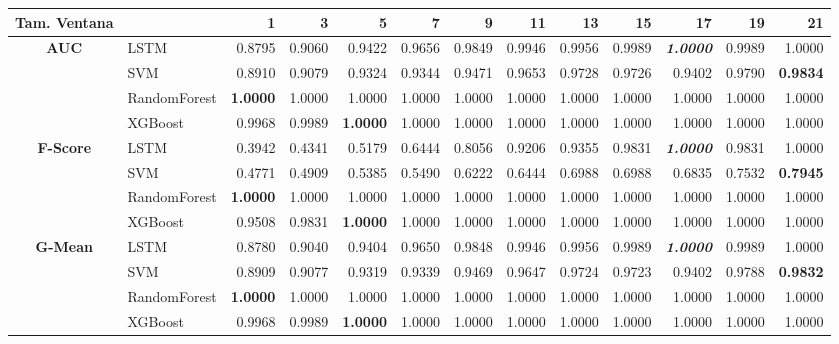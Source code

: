 \begin{table}[H]
\centering
\begin{adjustbox}{max width=14cm}
	\begin{tabular}{|c|l|r|r|r|r|r|r|r|r|r|r|r|}
		\hline
		\textbf{Tam. Ventana} &         &      1  &      3  &      5  &      7  &      9  &      11 &      13 &      15 &      17 &      19 &      21 \\
		\hline
		\textbf{AUC} &  LSTM &  0.8795 &  0.9060 &  0.9422 &  0.9656 &  0.9849 &  0.9946 &  0.9956 &  0.9989 & \textit{ \textbf{  1.0000 } } &  0.9989 &  1.0000 \\
		&  SVM &  0.8910 &  0.9079 &  0.9324 &  0.9344 &  0.9471 &  0.9653 &  0.9728 &  0.9726 &  0.9402 &  0.9790 & \textbf{  0.9834 } \\
		&  RandomForest & \textbf{  1.0000 } &  1.0000 &  1.0000 &  1.0000 &  1.0000 &  1.0000 &  1.0000 &  1.0000 &  1.0000 &  1.0000 &  1.0000 \\
		&  XGBoost &  0.9968 &  0.9989 & \textbf{  1.0000 } &  1.0000 &  1.0000 &  1.0000 &  1.0000 &  1.0000 &  1.0000 &  1.0000 &  1.0000 \\
		\hline
		\textbf{F-Score} &  LSTM &  0.3942 &  0.4341 &  0.5179 &  0.6444 &  0.8056 &  0.9206 &  0.9355 &  0.9831 & \textit{ \textbf{  1.0000 } } &  0.9831 &  1.0000 \\
		&  SVM &  0.4771 &  0.4909 &  0.5385 &  0.5490 &  0.6222 &  0.6444 &  0.6988 &  0.6988 &  0.6835 &  0.7532 & \textbf{  0.7945 } \\
		&  RandomForest & \textbf{  1.0000 } &  1.0000 &  1.0000 &  1.0000 &  1.0000 &  1.0000 &  1.0000 &  1.0000 &  1.0000 &  1.0000 &  1.0000 \\
		&  XGBoost &  0.9508 &  0.9831 & \textbf{  1.0000 } &  1.0000 &  1.0000 &  1.0000 &  1.0000 &  1.0000 &  1.0000 &  1.0000 &  1.0000 \\
		\hline
		\textbf{G-Mean} &  LSTM &  0.8780 &  0.9040 &  0.9404 &  0.9650 &  0.9848 &  0.9946 &  0.9956 &  0.9989 & \textit{ \textbf{  1.0000 } } &  0.9989 &  1.0000 \\
		&  SVM &  0.8909 &  0.9077 &  0.9319 &  0.9339 &  0.9469 &  0.9647 &  0.9724 &  0.9723 &  0.9402 &  0.9788 & \textbf{  0.9832 } \\
		&  RandomForest & \textbf{  1.0000 } &  1.0000 &  1.0000 &  1.0000 &  1.0000 &  1.0000 &  1.0000 &  1.0000 &  1.0000 &  1.0000 &  1.0000 \\
		&  XGBoost &  0.9968 &  0.9989 & \textbf{  1.0000 } &  1.0000 &  1.0000 &  1.0000 &  1.0000 &  1.0000 &  1.0000 &  1.0000 &  1.0000 \\

\end{tabular}
\end{adjustbox}
\end{table}
